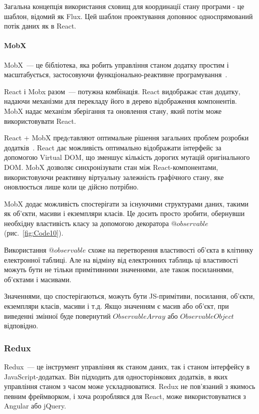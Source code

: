 Загальна концепція використання сховищ для координації стану програми - це шаблон, відомий як Flux. Цей шаблон проектування доповнює односпрямований потік даних як в React.

\paragraph{MobX}

MobX~--- це бібліотека, яка робить управління станом додатку простим і масштабується, застосовуючи функціонально-реактивне програмування~\cite{mezzalira2018mobx}. 

React і Mobx разом~--- потужна комбінація. React видображає стан додатку, надаючи механізми для перекладу його в дерево відображення компонентів. MobX надає механізм зберігання та оновлення стану, який потім може використовувати React.

React + MobX предcтавляют оптимальне рішення загальних проблем розробки додатків~\cite{9781789344837}. React дає можливість оптимально відображати інтерфейс за допомогою Virtual DOM, що зменшує кількість дорогих мутацій оригінального DOM. MobX дозволяє синхронізувати стан між React-компонентами, використовуючи реактивну віртуальну залежність графічного стану, яке оновлюється лише коли це дійсно потрібно.

MobX додає можливість спостерігати за існуючими структурами даних, такими як об'єкти, масиви і екземпляри класів. Це досить просто зробити, обернувши необхідну властивість класу за допомогою декоратора $@observable$ (рис.~\ref{fig:Code10}).


Використання $@observable$ схоже на перетворення властивості об'єкта в клітинку електронної таблиці. Але на відміну від електронних таблиць ці властивості можуть бути не тільки примітивними значеннями, але також посиланнями, об'єктами і масивами.

Значеннями, що спостерігаються, можуть бути JS-примітиви, посилання, об'єкти, екземпляри класів, масиви і т.д. Якщо значенням є масив або об'єкт, при виведенні змінної буде повернутий $Observable Array$ або $Observable Object$ відповідно.

\subsubsection{Redux}

Redux~--- це інструмент управління як станом даних, так і станом інтерфейсу в JavaScript-додатках. Він підходить для односторінкових додатків, в яких управління станом з часом може ускладнюватися. Redux не пов'язаний з якимось певним фреймворком, і хоча розроблявся для React, може використовуватися з Angular або jQuery.


